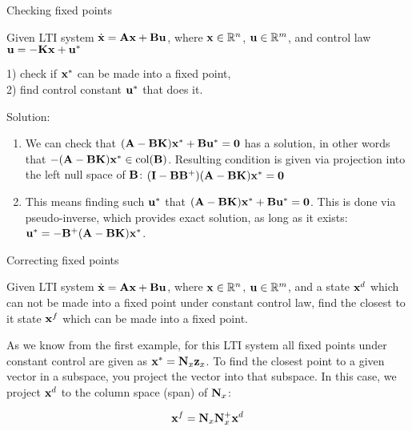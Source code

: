 \documentclass{beamer}
\begin{document}
\begin{frame}{Checking fixed points}
\begin{flushleft}

Given LTI system $\dot{\mathbf{x}} = \mathbf{A} \mathbf{x} + \mathbf{B} \mathbf{u}$, where $\mathbf{x} \in \mathbb{R}^n$, $\mathbf{u} \in \mathbb{R}^m$, and control law $\mathbf{u} = -\mathbf{K}\mathbf{x} + \mathbf{u}^*$

1) check if $\mathbf{x}^*$ can be made into a fixed point, \\
2) find control constant $\mathbf{u}^*$ that does it.

\bigskip

Solution: 

\begin{enumerate}
    \item We can check that $(\mathbf{A}-\mathbf{B}\mathbf{K}) \mathbf{x}^* + \mathbf{B} \mathbf{u}^* = \mathbf{0}$ has a solution, in other words that $-(\mathbf{A}-\mathbf{B}\mathbf{K}) \mathbf{x}^* \in \text{col}(\mathbf{B})$. Resulting condition is given via projection into the left null space of $\mathbf{B}$: $(\mathbf{I} - \mathbf{B}\mathbf{B}^+)(\mathbf{A}-\mathbf{B}\mathbf{K})\mathbf{x}^* = \mathbf{0}$
    \item This means finding such $\mathbf{u}^*$ that $(\mathbf{A}-\mathbf{B}\mathbf{K}) \mathbf{x}^* + \mathbf{B}\mathbf{u}^*= \mathbf{0}$. This is done via pseudo-inverse, which provides exact solution, as long as it exists: $\mathbf{u}^*= -\mathbf{B}^+(\mathbf{A}-\mathbf{B}\mathbf{K}) \mathbf{x}^*$.
\end{enumerate}

\end{flushleft}
\end{frame}




\begin{frame}{Correcting fixed points}
\begin{flushleft}

Given LTI system $\dot{\mathbf{x}} = \mathbf{A} \mathbf{x} + \mathbf{B} \mathbf{u}$, where $\mathbf{x} \in \mathbb{R}^n$, $\mathbf{u} \in \mathbb{R}^m$, and a state $\mathbf{x}^d$ which can not be made into a fixed point under constant control law, find the closest to it state $\mathbf{x}^f$ which can be made into a fixed point.

\bigskip

As we know from the first example, for this LTI system all fixed points under constant control are given as $\mathbf{x}^* = \mathbf{N}_x \mathbf{z}_x$. To find the closest point to a given vector in a subspace, you project the vector into that subspace. In this case, we project $\mathbf{x}^d$ to the column space (span) of $\mathbf{N}_x$:

\begin{equation}
    \mathbf{x}^f = \mathbf{N}_x\mathbf{N}_x^+ \mathbf{x}^d
\end{equation}

\end{flushleft}
\end{frame}
\end{document}
